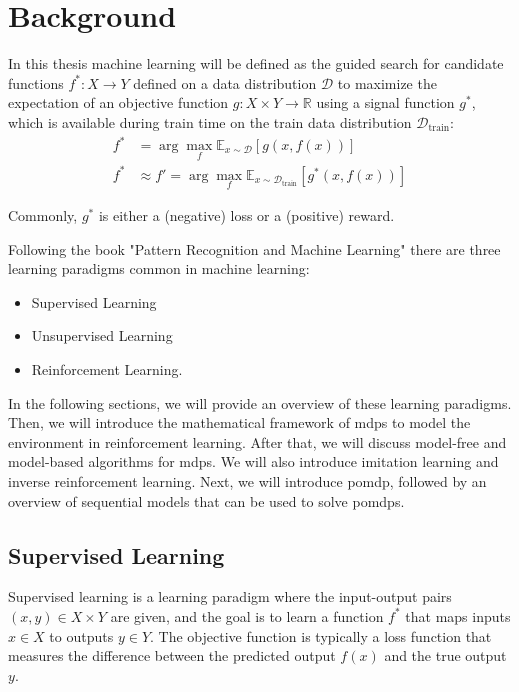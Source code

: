 
\chapter{Background}
\label{chapter:Background}
In this thesis machine learning will be defined as the guided search for candidate functions $f^*: X \to Y$ defined on a data distribution $\mathcal{D}$ to maximize the expectation of an objective function 
${g: X \times Y \to \mathbb{R}}$ using a signal function $g^*$, which is available during train time on the train data distribution $\mathcal{D}_{\text{train}}$:
\begin{equation}
    \label{general_learning_paradigm}
    \begin{aligned}
        f^* &= \arg\max_{f} \mathbb{E}_{x \sim \mathcal{D}}[g(x,f(x))] \\
        f^* &\approx f' = \arg\max_{f} \mathbb{E}_{x \sim \mathcal{D}_{\text{train}}}[g^*(x,f(x))]
    \end{aligned}
\end{equation}

Commonly, $g^*$ is either a (negative) loss or a (positive) reward.

Following the book "Pattern Recognition and Machine Learning" \cite{bishop} there are three learning paradigms common in machine learning: 
\begin{itemize}
	\item Supervised Learning
	\item Unsupervised Learning
	\item Reinforcement Learning.
\end{itemize}

In the following sections, we will provide an overview of these learning paradigms. 
Then, we will introduce the mathematical framework of \ac{mdp}s to model the environment in reinforcement learning. 
After that, we will discuss model-free and model-based algorithms for \ac{mdp}s. We will also introduce imitation learning and inverse reinforcement learning. 
Next, we will introduce \ac{pomdp}, followed by an overview of sequential models that can be used 
to solve \ac{pomdp}s.

\section{Supervised Learning}
\label{section:super_learn}
Supervised learning is a learning paradigm where the input-output pairs $(x,y) \in X \times Y$ are given, and the goal is to learn a function 
$f^*$ that maps inputs $x \in X$ to outputs $y \in Y$. The objective function is typically a loss function that measures the difference between 
the predicted output $f(x)$ and the true output $y$.

